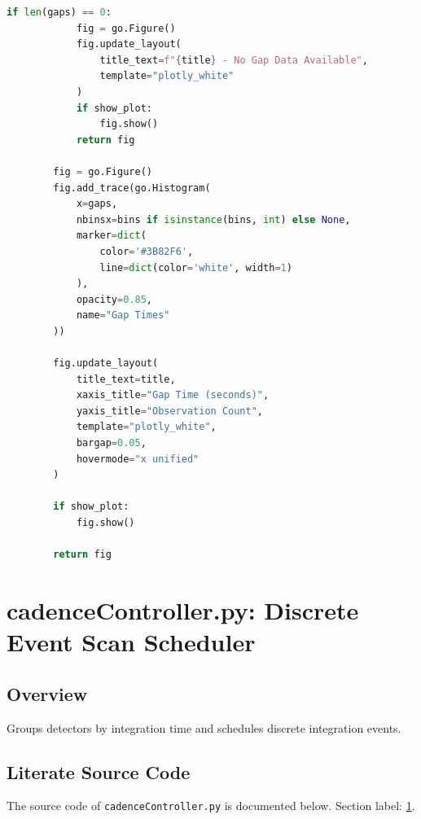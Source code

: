 \documentclass[10pt,a4paper]{report}
\begin{document}
\begin{lstlisting}[language=Python,caption={dataHandling.py Source Code},label={code:datahandling}]
        if len(gaps) == 0:
            fig = go.Figure()
            fig.update_layout(
                title_text=f"{title} - No Gap Data Available",
                template="plotly_white"
            )
            if show_plot:
                fig.show()
            return fig

        fig = go.Figure()
        fig.add_trace(go.Histogram(
            x=gaps,
            nbinsx=bins if isinstance(bins, int) else None,
            marker=dict(
                color='#3B82F6',
                line=dict(color='white', width=1)
            ),
            opacity=0.85,
            name="Gap Times"
        ))

        fig.update_layout(
            title_text=title,
            xaxis_title="Gap Time (seconds)",
            yaxis_title="Observation Count",
            template="plotly_white",
            bargap=0.05,
            hovermode="x unified"
        )

        if show_plot:
            fig.show()

        return fig

\end{lstlisting}



\chapter{cadenceController.py: Discrete Event Scan Scheduler}
\label{sec:cadencecontroller}

\section*{Overview}
Groups detectors by integration time and schedules discrete integration events.

\section*{Literate Source Code}
The source code of \texttt{cadenceController.py} is documented below. Section label: \ref{sec:cadencecontroller}.
\end{document}
